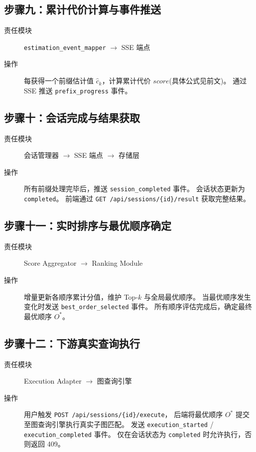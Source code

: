 \documentclass[12pt,a4paper]{article}
\begin{document}
\subsection{步骤九：累计代价计算与事件推送}
\begin{description}
  \item[责任模块] \texttt{estimation\_event\_mapper} $\to$ SSE 端点
  \item[操作] 每获得一个前缀估计值 $\hat{c}_k$，计算累计代价
        $\mathit{score}$(具体公式见前文)。
        通过 SSE 推送 \texttt{prefix\_progress} 事件。
\end{description}

\subsection{步骤十：会话完成与结果获取}
\begin{description}
  \item[责任模块] 会话管理器 $\to$ SSE 端点 $\to$ 存储层
  \item[操作] 所有前缀处理完毕后，推送 \texttt{session\_completed} 事件。
        会话状态更新为 \texttt{completed}。
        前端通过 \texttt{GET /api/sessions/\{id\}/result} 获取完整结果。
\end{description}

\subsection{步骤十一：实时排序与最优顺序确定}
\begin{description}
  \item[责任模块] Score Aggregator $\to$ Ranking Module
  \item[操作] 增量更新各顺序累计分值，维护 Top-$k$ 与全局最优顺序。
        当最优顺序发生变化时发送 \texttt{best\_order\_selected} 事件。
        所有顺序评估完成后，确定最终最优顺序 $O^*$。
\end{description}

\subsection{步骤十二：下游真实查询执行}
\begin{description}
  \item[责任模块] Execution Adapter $\to$ 图查询引擎
  \item[操作] 用户触发 \texttt{POST /api/sessions/\{id\}/execute}，
        后端将最优顺序 $O^*$ 提交至图查询引擎执行真实子图匹配。
        发送 \texttt{execution\_started} / \texttt{execution\_completed} 事件。
        仅在会话状态为 \texttt{completed} 时允许执行，否则返回 409。
\end{description}
\end{document}
